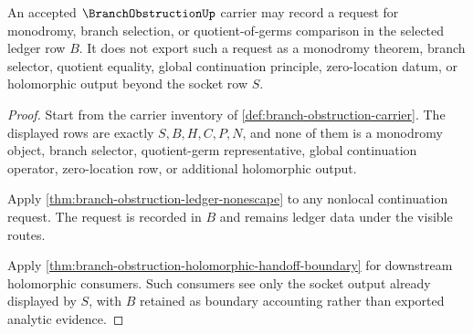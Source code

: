 \begin{theorem}
\label{thm:branch-obstruction-monodromy-nonexport}
An accepted $\BranchObstructionUp$ carrier may record a request for monodromy, branch selection, or quotient-of-germs comparison in the selected ledger row $B$. It does not export such a request as a monodromy theorem, branch selector, quotient equality, global continuation principle, zero-location datum, or holomorphic output beyond the socket row $S$.
\end{theorem}
\begin{proof}
Start from the carrier inventory of \autoref{def:branch-obstruction-carrier}. The displayed rows are exactly $S,B,H,C,P,N$, and none of them is a monodromy object, branch selector, quotient-germ representative, global continuation operator, zero-location row, or additional holomorphic output.

Apply \autoref{thm:branch-obstruction-ledger-nonescape} to any nonlocal continuation request. The request is recorded in $B$ and remains ledger data under the visible routes.

Apply \autoref{thm:branch-obstruction-holomorphic-handoff-boundary} for downstream holomorphic consumers. Such consumers see only the socket output already displayed by $S$, with $B$ retained as boundary accounting rather than exported analytic evidence.
\end{proof}


\begin{closurestatus}{\BranchObstructionUp}
  \theoryclosure{\seedClosure}
  \formalstatus{\unformalizedV}
\end{closurestatus}
